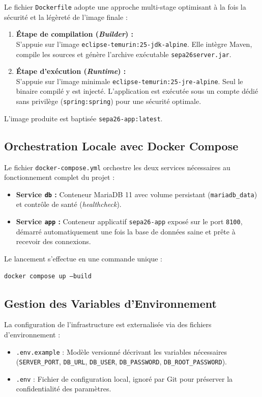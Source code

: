 \documentclass[12pt,a4paper]{article}
\begin{document}
Le fichier \texttt{Dockerfile} adopte une approche multi-stage optimisant à la fois la sécurité et la légèreté de l'image finale :
\begin{enumerate}[leftmargin=*]
    \item \textbf{Étape de compilation (\textit{Builder}) :} \\
    S'appuie sur l'image \texttt{eclipse-temurin:25-jdk-alpine}. Elle intègre Maven, compile les sources et génère l'archive exécutable \texttt{sepa26server.jar}.
    \item \textbf{Étape d'exécution (\textit{Runtime}) :} \\
    S'appuie sur l'image minimale \texttt{eclipse-temurin:25-jre-alpine}. Seul le binaire compilé y est injecté. L'application est exécutée sous un compte dédié sans privilège (\texttt{spring:spring}) pour une sécurité optimale.
\end{enumerate}

L'image produite est baptisée \texttt{sepa26-app:latest}.

\subsection{Orchestration Locale avec Docker Compose}

Le fichier \texttt{docker-compose.yml} orchestre les deux services nécessaires au fonctionnement complet du projet :
\begin{itemize}[leftmargin=*]
    \item \textbf{Service \texttt{db} :} Conteneur MariaDB 11 avec volume persistant (\texttt{mariadb\_data}) et contrôle de santé (\textit{healthcheck}).
    \item \textbf{Service \texttt{app} :} Conteneur applicatif \texttt{sepa26-app} exposé sur le port \texttt{8100}, démarré automatiquement une fois la base de données saine et prête à recevoir des connexions.
\end{itemize}

Le lancement s'effectue en une commande unique :
\begin{center}
    \texttt{docker compose up --build}
\end{center}

\subsection{Gestion des Variables d'Environnement}

La configuration de l'infrastructure est externalisée via des fichiers d'environnement :
\begin{itemize}[leftmargin=*]
    \item \texttt{.env.example} : Modèle versionné décrivant les variables nécessaires (\texttt{SERVER\_PORT}, \texttt{DB\_URL}, \texttt{DB\_USER}, \texttt{DB\_PASSWORD}, \texttt{DB\_ROOT\_PASSWORD}).
    \item \texttt{.env} : Fichier de configuration local, ignoré par Git pour préserver la confidentialité des paramètres.
\end{itemize}
\end{document}
